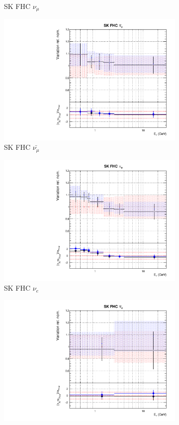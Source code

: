 \begin{figure}
\begin{subfigure}{0.45\textwidth}
  \caption{SK FHC $\nu_{\mu}$}
\end{subfigure}
\begin{subfigure}{0.45\textwidth}
  \centering
  \includegraphics[width=0.75\linewidth]{figs/comp5q2vs8q2flux9}
  \caption{SK FHC $\bar{\nu_{\mu}}$}
\end{subfigure}
\begin{subfigure}{0.45\textwidth}
  \centering
  \includegraphics[width=0.75\linewidth]{figs/comp5q2vs8q2flux10}
  \caption{SK FHC $\nu_{e}$}
\end{subfigure}
\begin{subfigure}{0.45\textwidth}
  \centering
  \includegraphics[width=0.75\linewidth]{figs/comp5q2vs8q2flux11}

\end{subfigure}
\end{figure}
